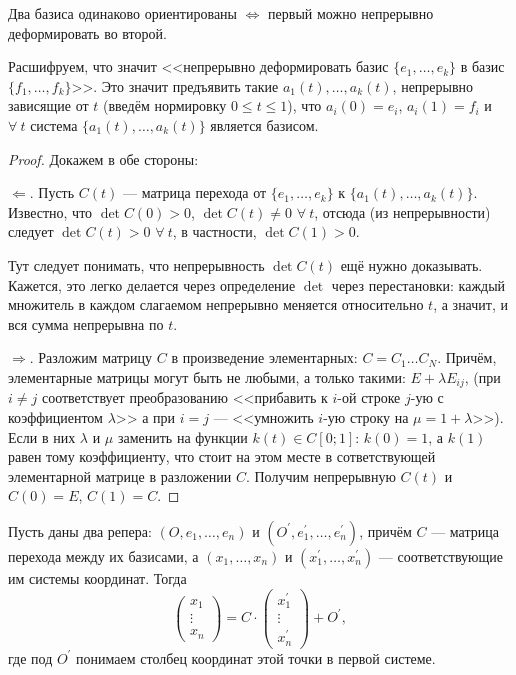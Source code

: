 \begin{theorem}
    Два базиса одинаково ориентированы $\Leftrightarrow$ первый можно непрерывно деформировать во второй.
\end{theorem}

Расшифруем, что значит <<непрерывно деформировать базис $\{e_1, \ldots, e_k\}$ в базис $\{f_1, \ldots, f_k\}$>>. Это значит предъявить такие $a_1(t), \ldots, a_k(t)$, непрерывно зависящие от $t$ (введём нормировку $0 \leqslant t \leqslant 1$), что $a_i(0) = e_i$, $a_i(1) = f_i$ и $\forall\!\:t$ система $\{a_1(t), \ldots, a_k(t)\}$ является базисом.

\begin{proof}
    Докажем в обе стороны:

    $\Leftarrow$. Пусть $C(t)$ --- матрица перехода от $\{e_1, \ldots, e_k\}$ к $\{a_1(t), \ldots, a_k(t)\}$. Известно, что $\det C(0) > 0$, $\det C(t) \ne 0$ $\forall\!\:t$, отсюда (из непрерывности) следует $\det C(t) > 0$ $\forall\!\:t$, в частности, $\det C(1) > 0$.

    Тут следует понимать, что непрерывность $\det C(t)$ ещё нужно доказывать. Кажется, это легко делается через определение $\det$ через перестановки: каждый множитель в каждом слагаемом непрерывно меняется относительно $t$, а значит, и вся сумма непрерывна по $t$.

    $\Rightarrow$. Разложим матрицу $C$ в произведение элементарных: $C = C_1\ldots C_N$. Причём, элементарные матрицы могут быть не любыми, а только такими: $E + \lambda E_{ij}$, (при $i \ne j$ соответствует преобразованию <<прибавить к $i$-ой строке $j$-ую с коэффициентом $\lambda$>> а при $i = j$ --- <<умножить $i$-ую строку на $\mu = 1 + \lambda$>>). Если в них $\lambda$ и $\mu$ заменить на функции $k(t) \in C[0; 1]$: $k(0) = 1$, а $k(1)$ равен тому коэффициенту, что стоит на этом месте в сответствующей элементарной матрице в разложении $C$. Получим непрерывную $C(t)$ и $C(0) = E$, $C(1) = C$.
\end{proof}

\begin{theorem}
    Пусть даны два репера: $(O, e_1, \ldots, e_n)$ и $(O^\prime, e_1^\prime, \ldots, e_n^\prime)$, причём $C$ --- матрица перехода между их базисами, а $(x_1, \ldots, x_n)$ и $(x_1^\prime, \ldots, x_n^\prime)$ --- соответствующие им системы координат. Тогда
    $$
    \begin{pmatrix}
        x_1\\
        \vdots\\
        x_n
    \end{pmatrix} = C \cdot
    \begin{pmatrix}
        x_1^\prime\\
        \vdots\\
        x_n^\prime
    \end{pmatrix} + O^\prime,
    $$
    где под $O^\prime$ понимаем столбец координат этой точки в первой системе.
\end{theorem}

